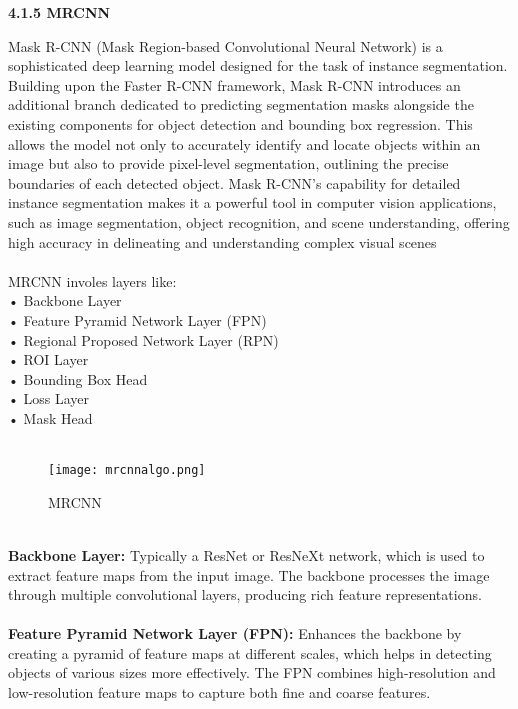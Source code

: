\documentclass[12pt, English]{article}
\begin{document}
\begin{large}
\textbf{4.1.5 MRCNN }\\
\end{large}
\text Mask R-CNN (Mask Region-based Convolutional Neural Network) is a sophisticated deep learning model designed for the task of instance segmentation. Building upon the Faster R-CNN framework, Mask R-CNN introduces an additional branch dedicated to predicting segmentation masks alongside the existing components for object detection and bounding box regression. This allows the model not only to accurately identify and locate objects within an image but also to provide pixel-level segmentation, outlining the precise boundaries of each detected object. Mask R-CNN’s capability for detailed instance segmentation makes it a powerful tool in computer vision applications, such as image segmentation, object recognition, and scene understanding, offering high accuracy in delineating and understanding complex visual scenes\\
\\
MRCNN involes layers like:\\
• Backbone Layer\\
• Feature Pyramid Network Layer (FPN)\\
• Regional Proposed Network Layer (RPN)\\
• ROI Layer\\
• Bounding Box Head\\
• Loss Layer\\
• Mask Head \\
\\
\begin{figure}[htb]
\begin{center}
\texttt{[image: mrcnnalgo.png]}
\end{center}
\begin{center}
\renewcommand{\thefigure}{4.2}
\caption{\footnotesize MRCNN }
\end{center}
\end{figure}\\
\textbf{Backbone Layer: }Typically a ResNet or ResNeXt network, which is used to extract feature maps from the input image. The backbone processes the image through multiple convolutional layers, producing rich feature representations.\\
\\
\textbf{Feature Pyramid Network Layer (FPN): }Enhances the backbone by creating a pyramid of feature maps at different scales, which helps in detecting objects of various sizes more effectively. The FPN combines high-resolution and low-resolution feature maps to capture both fine and coarse features.\\
\end{document}

